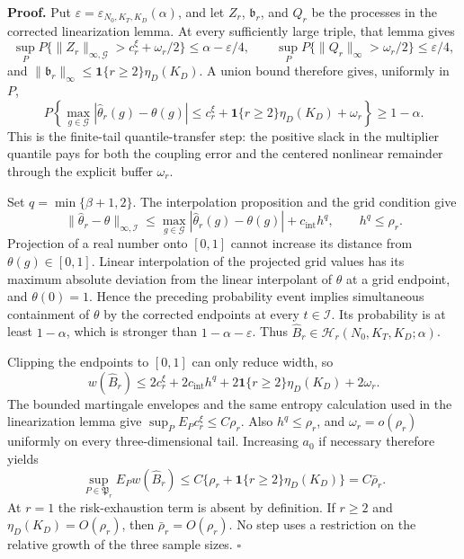 \textbf{Proof.}
Put \(\varepsilon=\varepsilon_{N_0,K_T,K_D}(\alpha)\), and let \(Z_r\), \(\mathfrak b_r\), and \(Q_r\) be the processes in the corrected linearization lemma.  At every sufficiently large triple, that lemma gives
\[
 \sup_P P\{\|Z_r\|_{\infty,\mathcal G}>c_r^\xi+\omega_r/2\}
 \le\alpha-\varepsilon/4,
 \qquad
 \sup_P P\{\|Q_r\|_\infty>\omega_r/2\}\le\varepsilon/4,
\]
and \(\|\mathfrak b_r\|_\infty\le\mathbf 1\{r\ge2\}\eta_D(K_D)\).  A union bound therefore gives, uniformly in \(P\),
\[
 P\!\left\{
 \max_{g\in\mathcal G}|\widehat\theta_r(g)-\theta(g)|
 \le c_r^\xi+\mathbf 1\{r\ge2\}\eta_D(K_D)+\omega_r
 \right\}\ge1-\alpha.
\]
This is the finite-tail quantile-transfer step: the positive slack in the multiplier quantile pays for both the coupling error and the centered nonlinear remainder through the explicit buffer \(\omega_r\).

Set \(q=\min\{\beta+1,2\}\).  The interpolation proposition and the grid condition give
\[
 \|\widehat\theta_r-\theta\|_{\infty,\mathcal I}
 \le\max_{g\in\mathcal G}|\widehat\theta_r(g)-\theta(g)|+c_{\mathrm{int}}h^q,
 \qquad h^q\le\rho_r.
\]
Projection of a real number onto \([0,1]\) cannot increase its distance from \(\theta(g)\in[0,1]\).  Linear interpolation of the projected grid values has its maximum absolute deviation from the linear interpolant of \(\theta\) at a grid endpoint, and \(\theta(0)=1\).  Hence the preceding probability event implies simultaneous containment of \(\theta\) by the corrected endpoints at every \(t\in\mathcal I\).  Its probability is at least \(1-\alpha\), which is stronger than \(1-\alpha-\varepsilon\).  Thus \(\widehat B_r\in\mathcal H_r(N_0,K_T,K_D;\alpha)\).

Clipping the endpoints to \([0,1]\) can only reduce width, so
\[
 w(\widehat B_r)
 \le2c_r^\xi+2c_{\mathrm{int}}h^q
 +2\mathbf 1\{r\ge2\}\eta_D(K_D)+2\omega_r.
\]
The bounded martingale envelopes and the same entropy calculation used in the linearization lemma give \(\sup_PE_Pc_r^\xi\le C\rho_r\).  Also \(h^q\le\rho_r\), and \(\omega_r=o(\rho_r)\) uniformly on every three-dimensional tail.  Increasing \(a_0\) if necessary therefore yields
\[
 \sup_{P\in\mathfrak P_r}E_Pw(\widehat B_r)
 \le C\{\rho_r+\mathbf 1\{r\ge2\}\eta_D(K_D)\}
 =C\bar\rho_r.
\]
At \(r=1\) the risk-exhaustion term is absent by definition.  If \(r\ge2\) and \(\eta_D(K_D)=O(\rho_r)\), then \(\bar\rho_r=O(\rho_r)\).  No step uses a restriction on the relative growth of the three sample sizes. \(\square\)